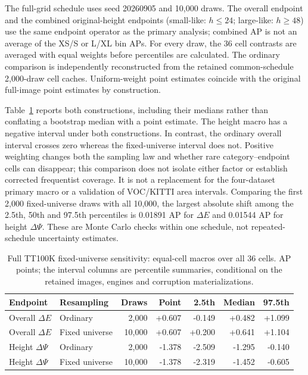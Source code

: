 \documentclass[10pt]{article}
\newcommand{\DeltaE}{\Delta E}
\newcommand{\DeltaPsi}{\Delta\Psi}
\begin{document}
The full-grid schedule uses seed 20260905 and 10,000 draws. The overall
endpoint and the combined original-height endpoints (small-like: $h\leq24$;
large-like: $h\geq48$) use the same endpoint operator as the primary analysis;
combined AP is not an average of the XS/S or L/XL bin APs. For every draw,
the 36 cell contrasts are averaged with equal weights before percentiles are
calculated. The ordinary comparison is independently reconstructed from the
retained common-schedule 2,000-draw cell caches. Uniform-weight point estimates
coincide with the original full-image point estimates by construction.

Table~\ref{tab:tt-full-fixed} reports both constructions, including their
medians rather than conflating a bootstrap median with a point estimate.
The height macro has a negative interval under both constructions. In contrast,
the ordinary overall interval crosses zero whereas the fixed-universe interval
does not. Positive weighting changes both the sampling law and whether rare
category--endpoint cells can disappear; this comparison does not isolate either
factor or establish corrected frequentist coverage. It is not a replacement
for the four-dataset primary macro or a validation of VOC/KITTI area intervals.
Comparing the first 2,000 fixed-universe draws with all 10,000, the largest
absolute shift among the 2.5th, 50th and 97.5th percentiles is 0.01891 AP for
$\DeltaE$ and 0.01544 AP for height $\DeltaPsi$. These are Monte Carlo checks
within one schedule, not repeated-schedule uncertainty estimates.

\begin{table}[htbp]
\centering\small
\caption{Full TT100K fixed-universe sensitivity: equal-cell macros over all
36 cells. AP points; the interval columns are percentile summaries, conditional
on the retained images, engines and corruption materializations.}
\label{tab:tt-full-fixed}
\begin{tabular}{llrrrrr}
\toprule
Endpoint & Resampling & Draws & Point & 2.5th & Median & 97.5th \\
\midrule
Overall $\DeltaE$ & Ordinary & 2,000 & +0.607 & -0.149 & +0.482 & +1.099 \\
Overall $\DeltaE$ & Fixed universe & 10,000 & +0.607 & +0.200 & +0.641 & +1.104 \\
Height $\DeltaPsi$ & Ordinary & 2,000 & -1.378 & -2.509 & -1.295 & -0.140 \\
Height $\DeltaPsi$ & Fixed universe & 10,000 & -1.378 & -2.319 & -1.452 & -0.605 \\
\bottomrule
\end{tabular}
\end{table}
\end{document}
